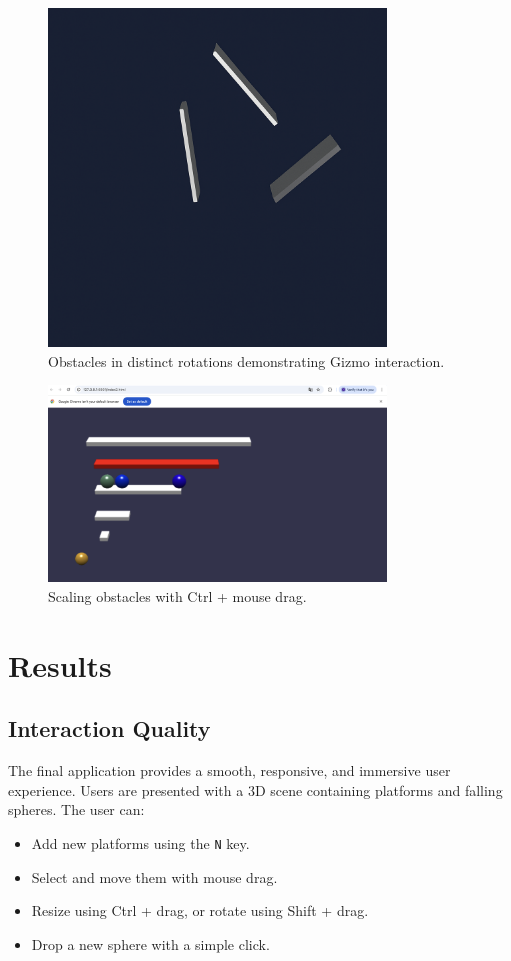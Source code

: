 \documentclass[a4paper,11pt]{article}
\begin{document}
\begin{figure}[h!]
    \centering
    \includegraphics[width=0.8\textwidth]{rotated.png}
    \caption{Obstacles in distinct rotations demonstrating Gizmo interaction.}
\end{figure}

\begin{figure}[h!]
    \centering
    \includegraphics[width=0.8\textwidth]{sizingobstacles.png}
    \caption{Scaling obstacles with Ctrl + mouse drag.}
\end{figure}
\newpage
\section{Results}
\subsection{Interaction Quality}
The final application provides a smooth, responsive, and immersive user experience. Users are presented with a 3D scene containing platforms and falling spheres. The user can:
\begin{itemize}
    \item Add new platforms using the \texttt{N} key.
    \item Select and move them with mouse drag.
    \item Resize using Ctrl + drag, or rotate using Shift + drag.
    \item Drop a new sphere with a simple click.
\end{itemize}
\end{document}

